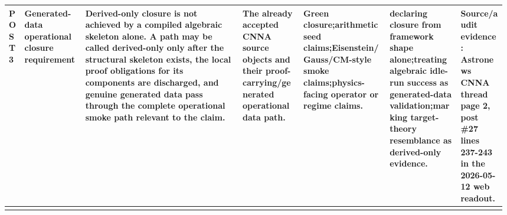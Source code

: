\begin{longtable}{L{0.035\linewidth} L{0.12\linewidth} L{0.31\linewidth} L{0.12\linewidth} L{0.17\linewidth} L{0.14\linewidth} L{0.09\linewidth}}
POST3 & Generated-data operational closure requirement & Derived-only closure is not achieved by a compiled algebraic skeleton alone. A path may be called derived-only only after the structural skeleton exists, the local proof obligations for its components are discharged, and genuine generated data pass through the complete operational smoke path relevant to the claim. & The already accepted CNNA source objects and their proof-carrying/\allowbreak{}generated operational data path. & Green closure;\newline arithmetic seed claims;\newline Eisenstein/\allowbreak{}Gauss/\allowbreak{}CM-style smoke claims;\newline physics-facing operator or regime claims. & declaring closure from framework shape alone;\newline treating algebraic idle-run success as generated-data validation;\newline marking target-theory resemblance as derived-only evidence. & Source/\allowbreak{}audit evidence: Astronews CNNA thread page 2, post \#27 lines 237-243 in the 2026-05-12 web readout.\\
\hline
\addlinespace[0.24em]
\end{longtable}
\normalsize

